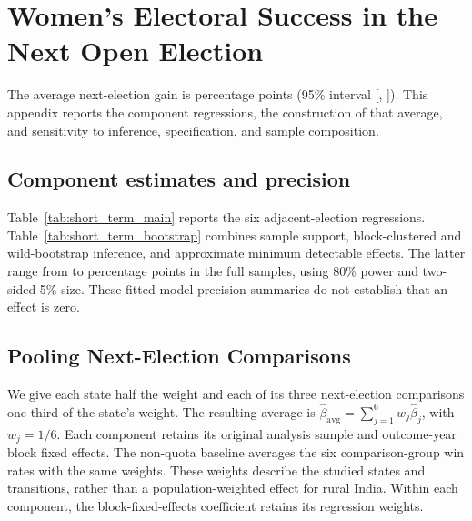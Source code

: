 \clearpage
\section{Women's Electoral Success in the Next Open Election}\label{sec:app_next_election}
\suppressfloats[t]

The average next-election gain is \poolEstimate{} percentage points (95\% interval [\poolLow{}, \poolHigh{}]). This appendix reports the component regressions, the construction of that average, and sensitivity to inference, specification, and sample composition.

\subsection{Component estimates and precision}

Table~\ref{tab:short_term_main} reports the six adjacent-election regressions. Table~\ref{tab:short_term_bootstrap} combines sample support, block-clustered and wild-bootstrap inference, and approximate minimum detectable effects. The latter range from \shortMdeMin{} to \shortMdeMax{} percentage points in the full samples, using 80\% power and two-sided 5\% size. These fitted-model precision summaries do not establish that an effect is zero.

\begin{table}[!htbp]
    \centering
    \caption{Women's Electoral Success in the Next Open Election: Regression Specifications}
    \label{tab:short_term_main}
    
\end{table}
\FloatBarrier


\FloatBarrier

\subsection{Pooling Next-Election Comparisons}\label{sec:pooling}

We give each state half the weight and each of its three next-election comparisons one-third of the state's weight. The resulting average is $\widehat\beta_{\mathrm{avg}}=\sum_{j=1}^{6}w_j\widehat\beta_j$, with $w_j=1/6$. Each component retains its original analysis sample and outcome-year block fixed effects. The non-quota baseline averages the six comparison-group win rates with the same weights. These weights describe the studied states and transitions, rather than a population-weighted effect for rural India. Within each component, the block-fixed-effects coefficient retains its regression weights.

